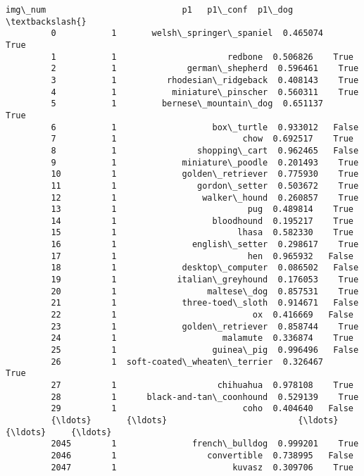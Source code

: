 \documentclass[11pt]{article}
\begin{document}
\begin{Verbatim}[commandchars=\\\{\}]
               img\_num                           p1   p1\_conf  p1\_dog  \textbackslash{}
         0           1       welsh\_springer\_spaniel  0.465074    True   
         1           1                      redbone  0.506826    True   
         2           1              german\_shepherd  0.596461    True   
         3           1          rhodesian\_ridgeback  0.408143    True   
         4           1           miniature\_pinscher  0.560311    True   
         5           1         bernese\_mountain\_dog  0.651137    True   
         6           1                   box\_turtle  0.933012   False   
         7           1                         chow  0.692517    True   
         8           1                shopping\_cart  0.962465   False   
         9           1             miniature\_poodle  0.201493    True   
         10          1             golden\_retriever  0.775930    True   
         11          1                gordon\_setter  0.503672    True   
         12          1                 walker\_hound  0.260857    True   
         13          1                          pug  0.489814    True   
         14          1                   bloodhound  0.195217    True   
         15          1                        lhasa  0.582330    True   
         16          1               english\_setter  0.298617    True   
         17          1                          hen  0.965932   False   
         18          1             desktop\_computer  0.086502   False   
         19          1            italian\_greyhound  0.176053    True   
         20          1                  maltese\_dog  0.857531    True   
         21          1             three-toed\_sloth  0.914671   False   
         22          1                           ox  0.416669   False   
         23          1             golden\_retriever  0.858744    True   
         24          1                     malamute  0.336874    True   
         25          1                   guinea\_pig  0.996496   False   
         26          1  soft-coated\_wheaten\_terrier  0.326467    True   
         27          1                    chihuahua  0.978108    True   
         28          1      black-and-tan\_coonhound  0.529139    True   
         29          1                         coho  0.404640   False   
         {\ldots}       {\ldots}                          {\ldots}       {\ldots}     {\ldots}   
         2045        1               french\_bulldog  0.999201    True   
         2046        1                  convertible  0.738995   False   
         2047        1                       kuvasz  0.309706    True   

\end{Verbatim}
\end{document}
